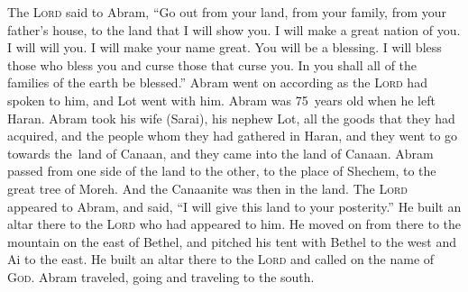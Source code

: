 
\begin{inparaenum}
   The \textsc{Lord} said to Abram, ``Go out from your land, from your family, from your father's house, to the land that I will show you.%
   I will make a great nation of you. I will will you. I will make your name great. You will be a blessing.%
   I will bless those who bless you and curse those that curse you. In you shall all of the families of the earth be blessed.''%
   Abram went on according as the \textsc{Lord} had spoken to him, and Lot went with him. Abram was 75~years old when he left Haran.%
   Abram took his wife (Sarai), his nephew Lot, all the goods that they had acquired, and the people whom they had gathered in Haran, and they went to go towards the\understood\ land of Canaan, and they came into the land of Canaan.%
   Abram passed from one side of the land to the other, to the place of Shechem, to the great tree of Moreh. And the Canaanite was then in the land.%
   The \textsc{Lord} appeared to Abram, and said, ``I will give this land to your posterity.'' He built an altar there to the \textsc{Lord} who had appeared to him.%
   He moved on from there to the mountain on the east of Bethel, and pitched his tent with Bethel to the west and Ai to the east. He built an altar there to the \textsc{Lord} and called on the name of \textsc{God}.%
   Abram traveled, going and traveling to the south.%
  

\end{inparaenum}
